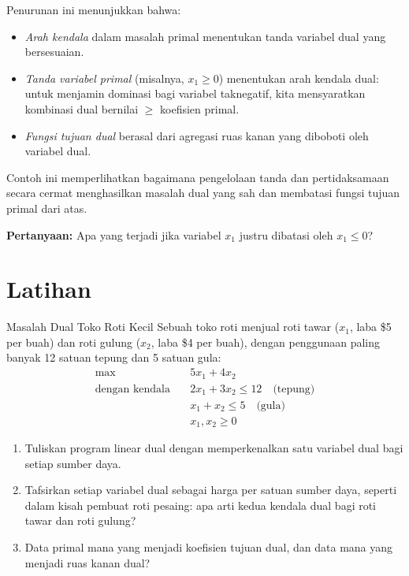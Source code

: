 Penurunan ini menunjukkan bahwa:
\begin{itemize}
  \item \emph{Arah kendala} dalam masalah primal menentukan tanda variabel dual yang bersesuaian.
  \item \emph{Tanda variabel primal} (misalnya, \( x_1 \geq 0 \)) menentukan arah kendala dual: untuk menjamin dominasi bagi variabel taknegatif, kita mensyaratkan kombinasi dual bernilai \(\geq\) koefisien primal.
  \item \emph{Fungsi tujuan dual} berasal dari agregasi ruas kanan yang diboboti oleh variabel dual.
\end{itemize}
Contoh ini memperlihatkan bagaimana pengelolaan tanda dan pertidaksamaan secara cermat menghasilkan masalah dual yang sah dan membatasi fungsi tujuan primal dari atas.

\textbf{Pertanyaan:} Apa yang terjadi jika variabel $x_1$ justru dibatasi oleh $x_1 \leq 0$?

\section{Latihan}


\begin{ex}{Masalah Dual Toko Roti Kecil}{}
\label{ex:dual-2x2-warmup}
 Sebuah toko roti menjual roti tawar ($x_1$, laba \$5 per buah) dan roti gulung ($x_2$, laba \$4 per buah), dengan penggunaan paling banyak 12 satuan tepung dan 5 satuan gula:
\[
\begin{aligned}
\max \quad & 5x_1 + 4x_2 \\
\text{dengan kendala} \quad & 2x_1 + 3x_2 \leq 12 \quad \text{(tepung)} \\
& x_1 + x_2 \leq 5 \quad \text{(gula)} \\
& x_1, x_2 \geq 0
\end{aligned}
\]
\begin{enumerate}
\item Tuliskan program linear dual dengan memperkenalkan satu variabel dual bagi setiap sumber daya.
\item Tafsirkan setiap variabel dual sebagai harga per satuan sumber daya, seperti dalam kisah pembuat roti pesaing: apa arti kedua kendala dual bagi roti tawar dan roti gulung?
\item Data primal mana yang menjadi koefisien tujuan dual, dan data mana yang menjadi ruas kanan dual?
\end{enumerate}
\exrefs{\S\ref{sec:duality-theory}}
\end{ex}

